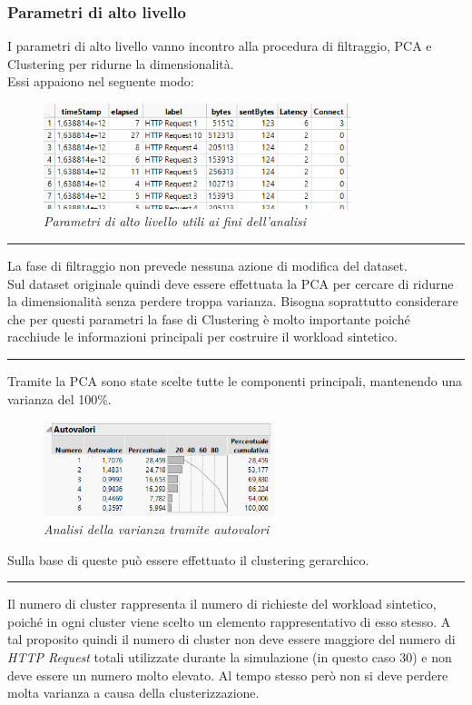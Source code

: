 \subsubsection{Parametri di alto livello}
I parametri di alto livello vanno incontro alla procedura di filtraggio, PCA e Clustering per ridurne la dimensionalità.
\\Essi appaiono nel seguente modo:
\begin{figure}[H]
	\centering
	\includegraphics[width=0.8\textwidth]{img/hw3/alto_livello_esempio.png}
	\caption{\textit{Parametri di alto livello utili ai fini dell'analisi}}
\end{figure}
\hrule
\vspace{0.3cm}
La fase di filtraggio non prevede nessuna azione di modifica del dataset.
\\Sul dataset originale quindi deve essere effettuata la PCA per cercare di ridurne la dimensionalità senza perdere troppa varianza. Bisogna soprattutto considerare che per questi parametri la fase di Clustering è molto importante poiché racchiude le informazioni principali per costruire il workload sintetico.
\vspace{0.3cm}
\hrule
\vspace{0.3cm}
Tramite la PCA sono state scelte tutte le componenti principali, mantenendo una varianza del 100\%.
\begin{figure}[H]
	\centering
	\includegraphics[width=0.6\textwidth]{img/hw3/autovalori.png}
	\caption{\textit{Analisi della varianza tramite autovalori}}
\end{figure}
Sulla base di queste può essere effettuato il clustering gerarchico.
\vspace{0.3cm}
\hrule
\vspace{0.3cm}
Il numero di cluster rappresenta il numero di richieste del workload sintetico, poiché in ogni cluster viene scelto un elemento rappresentativo di esso stesso. A tal proposito quindi il numero di cluster non deve essere maggiore del numero di \textit{HTTP Request} totali utilizzate durante la simulazione (in questo caso 30) e non deve essere un numero molto elevato. Al tempo stesso però non si deve perdere molta varianza a causa della clusterizzazione. 
